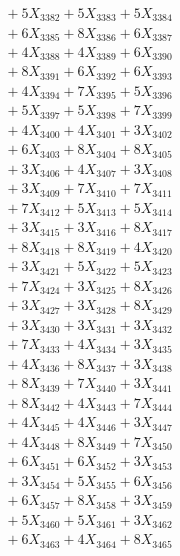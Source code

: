 \documentclass[a4paper,10pt]{article}
\begin{document}
{\begin{align}
&\;  + 5 X_{3382} + 5 X_{3383} + 5 X_{3384} \\[0.3ex]
&\;  + 6 X_{3385} + 8 X_{3386} + 6 X_{3387} \\[0.3ex]
&\;  + 4 X_{3388} + 4 X_{3389} + 6 X_{3390} \\[0.3ex]
&\;  + 8 X_{3391} + 6 X_{3392} + 6 X_{3393} \\[0.3ex]
&\;  + 4 X_{3394} + 7 X_{3395} + 5 X_{3396} \\[0.3ex]
&\;  + 5 X_{3397} + 5 X_{3398} + 7 X_{3399} \\[0.5ex]\allowbreak
&\;  + 4 X_{3400} + 4 X_{3401} + 3 X_{3402} \\[0.3ex]
&\;  + 6 X_{3403} + 8 X_{3404} + 8 X_{3405} \\[0.3ex]
&\;  + 3 X_{3406} + 4 X_{3407} + 3 X_{3408} \\[0.3ex]
&\;  + 3 X_{3409} + 7 X_{3410} + 7 X_{3411} \\[0.3ex]
&\;  + 7 X_{3412} + 5 X_{3413} + 5 X_{3414} \\[0.3ex]
&\;  + 3 X_{3415} + 3 X_{3416} + 8 X_{3417} \\[0.3ex]
&\;  + 8 X_{3418} + 8 X_{3419} + 4 X_{3420} \\[0.3ex]
&\;  + 3 X_{3421} + 5 X_{3422} + 5 X_{3423} \\[0.3ex]
&\;  + 7 X_{3424} + 3 X_{3425} + 8 X_{3426} \\[0.3ex]
&\;  + 3 X_{3427} + 3 X_{3428} + 8 X_{3429} \\[0.5ex]\allowbreak
&\;  + 3 X_{3430} + 3 X_{3431} + 3 X_{3432} \\[0.3ex]
&\;  + 7 X_{3433} + 4 X_{3434} + 3 X_{3435} \\[0.3ex]
&\;  + 4 X_{3436} + 8 X_{3437} + 3 X_{3438} \\[0.3ex]
&\;  + 8 X_{3439} + 7 X_{3440} + 3 X_{3441} \\[0.3ex]
&\;  + 8 X_{3442} + 4 X_{3443} + 7 X_{3444} \\[0.3ex]
&\;  + 4 X_{3445} + 4 X_{3446} + 3 X_{3447} \\[0.3ex]
&\;  + 4 X_{3448} + 8 X_{3449} + 7 X_{3450} \\[0.3ex]
&\;  + 6 X_{3451} + 6 X_{3452} + 3 X_{3453} \\[0.3ex]
&\;  + 3 X_{3454} + 5 X_{3455} + 6 X_{3456} \\[0.3ex]
&\;  + 6 X_{3457} + 8 X_{3458} + 3 X_{3459} \\[0.5ex]\allowbreak
&\;  + 5 X_{3460} + 5 X_{3461} + 3 X_{3462} \\[0.3ex]
&\;  + 6 X_{3463} + 4 X_{3464} + 8 X_{3465} \\[0.3ex]

\end{align}}
\end{document}
